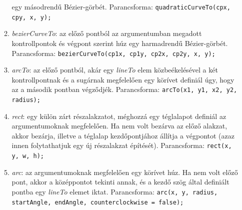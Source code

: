 \documentclass[12pt]{report}
\theoremstyle{definition}
\begin{document}
\begin{enumerate}[I.]
\begin{enumerate}
      egy másodrendű Bézier-görbét. Parancsforma:\newline
        \texttt{quadraticCurveTo(cpx, cpy, x, y);}
      \item \emph{bezierCurveTo}: az előző pontból az
      argumentumban megadott kontrollpontok és végpont szerint húz
      egy harmadrendű Bézier-görbét. Parancsforma:\newline
        \texttt{bezierCurveTo(cp1x, cp1y, cp2x, cp2y, x, y);}
      \item \emph{arcTo}: az előző pontból, akár egy
      \emph{lineTo} elem közbeékelésével a két kontrollpontnak
      és a sugárnak megfelelően egy körívet definiál úgy,
      hogy az a második pontban végződjék. Parancsforma:\newline
        \texttt{arcTo(x1, y1, x2, y2, radius);}
      \item \emph{rect}: egy külön zárt részalakzatot,
      méghozzá egy téglalapot definiál az argumentumoknak
      megfelelően. Ha nem volt bezárva az előző alakzat, akkor
      bezárja, illetve a téglalap kezdőpontjához állítja a
      végpontot (azaz innen folytathatjuk egy új részalakzat
      építését). Parancsforma:\newline
        \texttt{rect(x, y, w, h);}
      \item \emph{arc}: az argumentumoknak megfelelően egy
      körívet húz. Ha nem volt előző pont, akkor a
      középpontot tekinti annak, és a kezdő szög által
      definiált pontba egy \emph{lineTo} elemet iktat.
      Parancsforma:\newline
        \texttt{arc(x, y, radius, startAngle, endAngle, counterclockwise = false);}
    \end{enumerate}
\end{enumerate}
\end{document}
